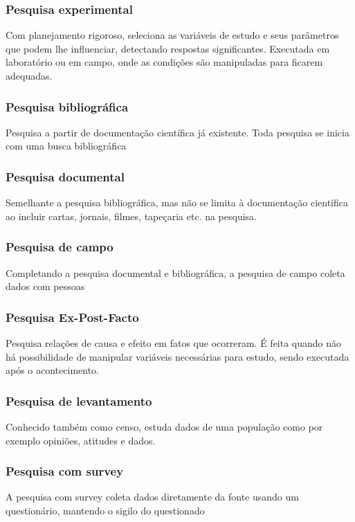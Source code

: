 \subsubsection{Pesquisa experimental}
Com planejamento rigoroso, seleciona as variáveis de estudo e seus parâmetros que podem lhe influenciar, detectando respostas significantes. Executada em laboratório ou em campo, onde as condições são manipuladas para ficarem adequadas.

\subsubsection{Pesquisa bibliográfica}
Pesquisa a partir de documentação científica já existente. Toda pesquisa se inicia com uma busca bibliográfica

\subsubsection{Pesquisa documental}
Semelhante a pesquisa bibliográfica, mas não se limita à documentação científica ao incluir cartas, jornais, filmes, tapeçaria etc. na pesquisa.

\subsubsection{Pesquisa de campo}
Completando a pesquisa documental e bibliográfica, a pesquisa de campo coleta dados com pessoas

\subsubsection{Pesquisa Ex-Post-Facto}
Pesquisa relações de causa e efeito em fatos que ocorreram. É feita quando não há possibilidade de manipular variáveis necessárias para estudo, sendo executada após o acontecimento.

\subsubsection{Pesquisa de levantamento}
Conhecido também como censo, estuda dados de uma população como por exemplo opiniões, atitudes e dados.

\subsubsection{Pesquisa com survey}
A pesquisa com survey coleta dados diretamente da fonte usando um questionário, mantendo o sigilo do questionado

